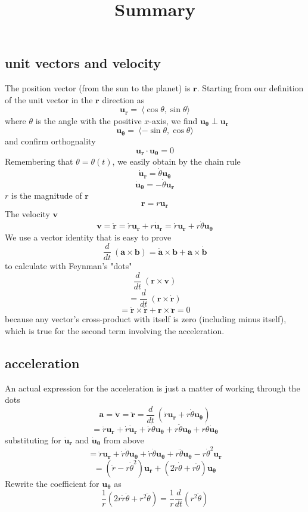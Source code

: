 \documentclass[11pt, oneside]{article}
\title{Summary}
\date{}
\begin{document}
\maketitle
\Large

\subsection*{unit vectors and velocity}
The position vector (from the sun to the planet) is $\mathbf{r}$.  Starting from our definition of the unit vector in the $\mathbf{r}$ direction as
\[ \mathbf{u_r} = \ \langle \cos \theta, \sin \theta \rangle \]
where $\theta$ is the angle with the positive $x$-axis, we find $\mathbf{u_{\theta}} \perp \mathbf{u_r}$
\[ \mathbf{u_{\theta}} = \ \langle -\sin \theta, \cos \theta \rangle \]
and confirm orthognality
\[ \mathbf{u_r} \cdot \mathbf{u_{\theta}} = 0 \]
Remembering that $\theta = \theta(t)$, we easily obtain by the chain rule
\[ \dot{\mathbf{u}}_\mathbf{r} = \dot{\theta} \mathbf{u_{\theta}} \]
\[  \dot{\mathbf{u}}_\mathbf{\theta} = -\dot{\theta} \mathbf{u_{r}} \]
$r$ is the magnitude of $\mathbf{r}$
\[ \mathbf{r} = r \mathbf{u_r} \]
The velocity $\mathbf{v}$
\[ \mathbf{v} = \dot{\mathbf{r}} = \dot{r} \mathbf{u_r} + r \dot{\mathbf{u}}_\mathbf{r}  =  \dot{r} \mathbf{u_r} +  r \dot{\theta}  \mathbf{u_{\theta}}\]
We use a vector identity that is easy to prove
\[ \frac{d}{dt} \ (\mathbf{a} \times \mathbf{b}) = \dot{\mathbf{a}} \times \mathbf{b} + \mathbf{a} \times \dot{\mathbf{b}} \]
to calculate with Feynman's "dots"
\[ \frac{d}{dt} \ (\mathbf{r} \times \mathbf{v}) \]
\[ =  \frac{d}{dt} \ (\mathbf{r} \times \dot{\mathbf{r}}) \]
\[  =  \dot{\mathbf{r}} \times \dot{\mathbf{r}} +  \mathbf{r} \times \ddot{\mathbf{r}} = 0\]
because any vector's cross-product with itself is zero (including minus itself), which is true for the second term involving the acceleration.
\subsection*{acceleration}
An actual expression for the acceleration is just a matter of working through the dots
\[ \mathbf{a} = \dot{\mathbf{v}} = \ddot{\mathbf{r}} = \frac{d}{dt} \ (\dot{r}\mathbf{u_r} + r \dot{\theta} \mathbf{u_{\theta}}) \]
 \[ = \ddot{r}\mathbf{u_r} + \dot{r}\dot{\mathbf{u}}_\mathbf{r} + \dot{r} \dot{\theta} \mathbf{u_{\theta}} + r \ddot{\theta} \mathbf{u_{\theta}} + r \dot{\theta}  \dot{\mathbf{u}}_\mathbf{\theta}\]
substituting for $\dot{\mathbf{u}}_\mathbf{r}$ and $\dot{\mathbf{u}}_\mathbf{\theta}$ from above
\[ = \ddot{r}\mathbf{u_r} + \dot{r}\dot{\theta} \mathbf{u_{\theta}} + \dot{r} \dot{\theta} \mathbf{u_{\theta}} + r \ddot{\theta} \mathbf{u_{\theta}} - r \dot{\theta}^2  \mathbf{u}_\mathbf{r}\]
\[ = (\ddot{r} - r \dot{\theta}^2)  \mathbf{u}_\mathbf{r} + (2\dot{r} \dot{\theta} + r \ddot{\theta}) \mathbf{u_{\theta}}  \]
Rewrite the coefficient for $\mathbf{u_{\theta}}$ as
\[  \frac{1}{r}(2r \dot{r} \dot{\theta} + r^2\ddot{\theta}) = \frac{1}{r} \frac{d}{dt} (r^2\dot{\theta})  \]
\end{document}
